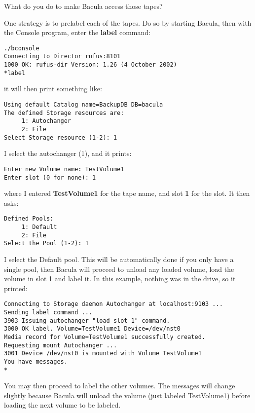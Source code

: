 What do you do to make Bacula access those tapes? 

One strategy is to prelabel each of the tapes. Do so by starting Bacula, then
with the Console program, enter the {\bf label} command: 

\footnotesize
\begin{verbatim}
./bconsole
Connecting to Director rufus:8101
1000 OK: rufus-dir Version: 1.26 (4 October 2002)
*label
\end{verbatim}
\normalsize

it will then print something like: 

\footnotesize
\begin{verbatim}
Using default Catalog name=BackupDB DB=bacula
The defined Storage resources are:
     1: Autochanger
     2: File
Select Storage resource (1-2): 1
\end{verbatim}
\normalsize

I select the autochanger (1), and it prints: 

\footnotesize
\begin{verbatim}
Enter new Volume name: TestVolume1
Enter slot (0 for none): 1
\end{verbatim}
\normalsize

where I entered {\bf TestVolume1} for the tape name, and slot {\bf 1} for the
slot. It then asks: 

\footnotesize
\begin{verbatim}
Defined Pools:
     1: Default
     2: File
Select the Pool (1-2): 1
\end{verbatim}
\normalsize

I select the Default pool. This will be automatically done if you only have a
single pool, then Bacula will proceed to unload any loaded volume, load the
volume in slot 1 and label it. In this example, nothing was in the drive, so
it printed: 

\footnotesize
\begin{verbatim}
Connecting to Storage daemon Autochanger at localhost:9103 ...
Sending label command ...
3903 Issuing autochanger "load slot 1" command.
3000 OK label. Volume=TestVolume1 Device=/dev/nst0
Media record for Volume=TestVolume1 successfully created.
Requesting mount Autochanger ...
3001 Device /dev/nst0 is mounted with Volume TestVolume1
You have messages.
*
\end{verbatim}
\normalsize

You may then proceed to label the other volumes. The messages will change
slightly because Bacula will unload the volume (just labeled TestVolume1)
before loading the next volume to be labeled. 

